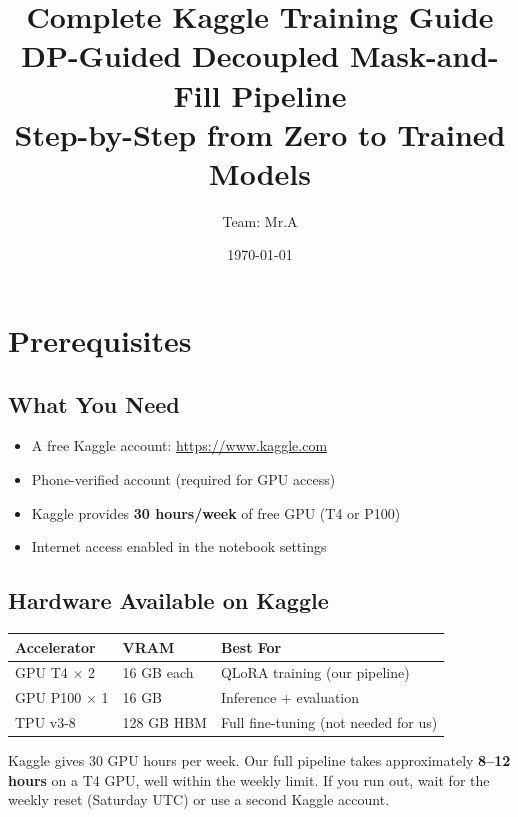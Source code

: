 \documentclass[11pt, a4paper]{article}
\title{\textbf{Complete Kaggle Training Guide}\\[0.3em]
\Large DP-Guided Decoupled Mask-and-Fill Pipeline\\
Step-by-Step from Zero to Trained Models}
\author{Team: Mr.A}
\date{\today}
\begin{document}
\maketitle
\tableofcontents
\newpage

\section{Prerequisites}

\subsection{What You Need}
\begin{itemize}
    \item A free Kaggle account: \url{https://www.kaggle.com}
    \item Phone-verified account (required for GPU access)
    \item Kaggle provides \textbf{30 hours/week} of free GPU (T4 or P100)
    \item Internet access enabled in the notebook settings
\end{itemize}

\subsection{Hardware Available on Kaggle}
\begin{table}[h]
\centering
\begin{tabular}{lll}
\toprule
\textbf{Accelerator} & \textbf{VRAM} & \textbf{Best For} \\
\midrule
GPU T4 $\times$ 2 & 16 GB each & QLoRA training (our pipeline) \\
GPU P100 $\times$ 1 & 16 GB & Inference + evaluation \\
TPU v3-8 & 128 GB HBM & Full fine-tuning (not needed for us) \\
\bottomrule
\end{tabular}
\end{table}

\begin{important}
Kaggle gives 30 GPU hours per week. Our full pipeline takes approximately \textbf{8--12 hours} on a T4 GPU, well within the weekly limit. If you run out, wait for the weekly reset (Saturday UTC) or use a second Kaggle account.
\end{important}
\end{document}
